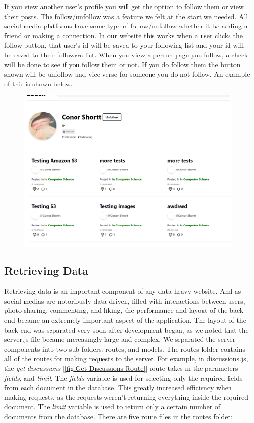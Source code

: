 If you view another user's profile you will get the option to follow them or view their posts. 
The follow/unfollow was a feature we felt at the start we needed. All social media platforms have some type of follow/unfollow whether it be adding a friend or making a connection. In our website this works when a user clicks the follow button, that user's id will be saved to your following list and your id will be saved to their followers list. When you view a person page you follow, a check will be done to see if you follow them or not. If you do follow them the button shown will be unfollow and vice verse for someone you do not follow. An example of this is shown below.
\begin{figure}[H]
  \centering
  \includegraphics[scale=0.4]{img/OtherProfile.PNG}
  \label{fig:OtherProfile}
\end{figure}

\subsection{Retrieving Data}

Retrieving data is an important component of any data heavy website. And as social medias are notoriously data-driven, filled with interactions between users, photo sharing, commenting, and liking, the performance and layout of the back-end became an extremely important aspect of the application. The layout of the back-end was separated very soon after development began, as we noted that the server.js file became increasingly large and complex. We separated the server components into two sub folders: routes, and models. The routes folder contains all of the routes for making requests to the server. For example, in discussions.js, the \textit{get-discussions} [\ref{fig:Get Discussions Route}] route takes in the parameters \textit{fields}, and \textit{limit}. The \textit{fields} variable is used for selecting only the required fields from each document in the database. This greatly increased efficiency when making requests, as the requests weren't returning everything inside the required document. The \textit{limit} variable is used to return only a certain number of documents from the database. There are five route files in the routes folder:

